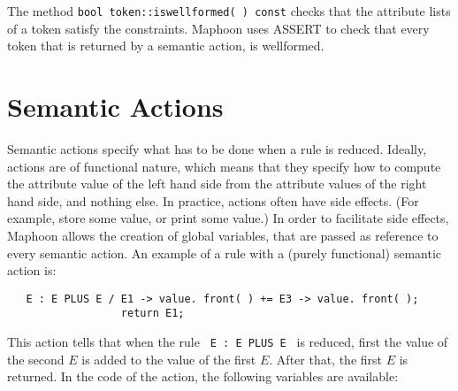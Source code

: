 \documentclass{article}
\begin{document}
\noindent
The method \verb+bool token::iswellformed( ) const+ checks that the 
attribute lists of a token satisfy the constraints. 
Maphoon uses ASSERT to check
that every token that is returned by a semantic action, is 
wellformed.

\section{Semantic Actions}
\label{Sect_semantic}

\noindent
Semantic actions specify what has to be done when a rule is reduced. 
Ideally, actions are of functional nature, which means
that they specify how to compute the attribute value of the left hand side 
from the attribute values of the right hand side,
and nothing else. 
In practice, actions often have side effects.
(For example, store some value, or print some value.)
In order to facilitate side effects, Maphoon allows the creation
of global variables, that are passed as reference to
every semantic action. 
An example of a rule with a (purely functional) semantic action is:
\begin{verbatim}
   E : E PLUS E / E1 -> value. front( ) += E3 -> value. front( ); 
                  return E1;
\end{verbatim}
This action tells that when the rule 
\verb+ E : E PLUS E + is reduced, first the value of the second $ E $
is added to the value of the first $ E. $ After that, 
the first $ E $ is returned.
In the code of the action, the following variables are available:
\end{document}
